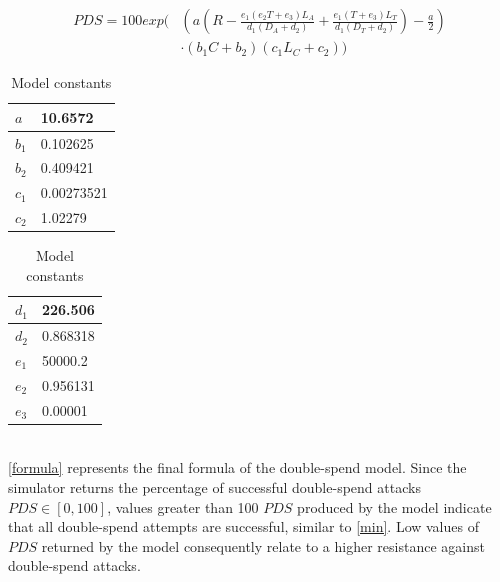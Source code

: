 \documentclass[a4paper,12pt,twoside]{report}
\begin{document}
\begin{equation}\label{formula}
\begin{split}
PDS = 100 exp \Biggl( & \left( a \left( R-\frac{e_1 \left( e_2T+e_3 \right) L_A}{d_1 \left( D_A+d_2 \right)}+\frac{e_1 \left( T+e_3 \right) L_T}{d_1 \left( D_T+d_2 \right)} \right) - \frac{a}{2} \right) \\
           & \cdot \left( b_1C+b_2 \right) \left( c_1L_C+c_2 \right) \Biggr)
\end{split}
\end{equation}
\begin{table}[hb!]
\centering
\begin{tabular}{|l|l|} \hline
$a$ & 10.6572 \\ \hline
$b_1$ & 0.102625 \\ \hline
$b_2$ & 0.409421 \\ \hline
$c_1$ & 0.00273521 \\ \hline
$c_2$ & 1.02279 \\ \hline
\end{tabular}
\begin{tabular}{|l|l|} \hline
$d_1$ & 226.506 \\ \hline
$d_2$ & 0.868318 \\ \hline
$e_1$ & 50000.2 \\ \hline
$e_2$ & 0.956131 \\ \hline
$e_3$ & 0.00001 \\ \hline
\end{tabular}
\caption{Model constants}
\label{constants}
\end{table}
\\
\autoref{formula} represents the final formula of the double-spend model. Since the simulator returns the percentage of successful double-spend attacks $PDS \in [0, 100]$, values greater than 100 $PDS$ produced by the model indicate that all double-spend attempts are successful, similar to \autoref{min}. Low values of $PDS$ returned by the model consequently relate to a higher resistance against double-spend attacks.
\end{document}
